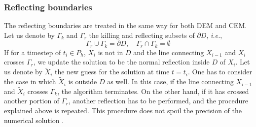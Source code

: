 \subsubsection{Reflecting boundaries}
The reflecting boundaries are treated in the same way for both DEM and CEM. Let us denote by $\Gamma_k$ and $\Gamma_r$ the killing and reflecting subsets of $\partial D$, \textit{i.e.},
\begin{equation}\label{eq:Boundaries}
	\Gamma_r \cup \Gamma_k = \partial D, \quad \Gamma_r \cap \Gamma_k = \emptyset
\end{equation} 
If for a timestep of $t_i \in P_h$, $X_i$ is not in $D$ and the line connecting $X_{i-1}$ and $X_i$ crosses $\Gamma_r$, we update the solution to be the normal reflection inside $D$ of $X_i$. Let us denote by $\tilde X_i$ the new guess for the solution at time $t = t_i$. One has to consider the case in which $\tilde X_i$ is outside $D$ as well. In this case, if the line connecting $X_{i-1}$ and $\tilde X_i$ crosses $\Gamma_k$, the algorithm terminates. On the other hand, if it has crossed another portion of $\Gamma_r$, another reflection has to be performed, and the procedure explained above is repeated. This procedure does not spoil the precision of the numerical solution \cite{Helmuth}.


